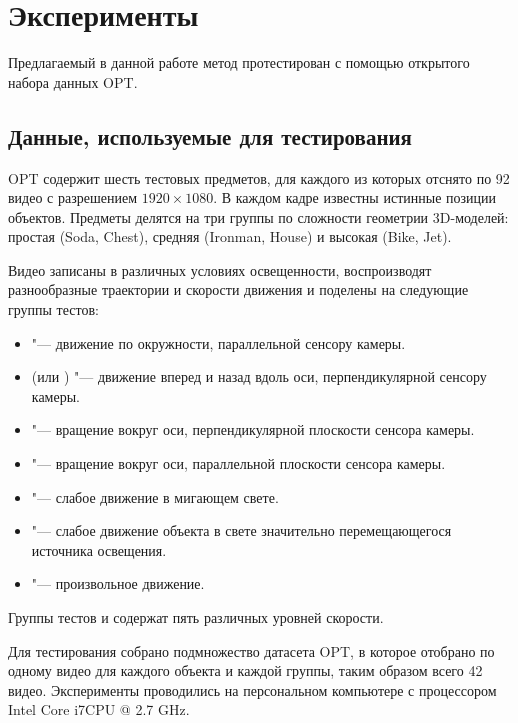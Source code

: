 \section{Эксперименты}\label{experiments}

Предлагаемый в данной работе метод протестирован с помощью открытого набора
данных OPT\cite{OPT}.

\subsection{Данные, используемые для тестирования}

OPT содержит шесть тестовых предметов, для каждого из которых отснято
по 92 видео с разрешением $1920\times1080$.
В каждом кадре известны истинные позиции объектов.
Предметы делятся на три группы по сложности геометрии 3D-моделей: простая
(Soda, Chest), средняя (Ironman, House) и высокая (Bike, Jet).

Видео записаны в различных условиях освещенности, воспроизводят разнообразные
траектории и скорости движения и поделены на следующие группы тестов:
\begin{itemize}
    \item {} "--- движение по окружности, параллельной
        сенсору камеры.
    \item {} (или ) "--- движение вперед и
        назад вдоль оси, перпендикулярной сенсору камеры.
    \item {} "--- вращение вокруг оси, перпендикулярной
        плоскости сенсора камеры.
    \item {} "--- вращение вокруг оси, параллельной
        плоскости сенсора камеры.
    \item {} "--- слабое движение в мигающем свете.
    \item {} "--- слабое движение объекта в свете значительно
        перемещающегося источника освещения.
    \item {} "--- произвольное движение.
\end{itemize}
Группы тестов  и  содержат пять различных
уровней скорости.

Для тестирования собрано подмножество датасета OPT, в которое отобрано по
одному видео для каждого объекта и каждой группы, таким образом всего 42 видео.
Эксперименты проводились на персональном компьютере с процессором Intel Core i7CPU @ 2.7 GHz.


